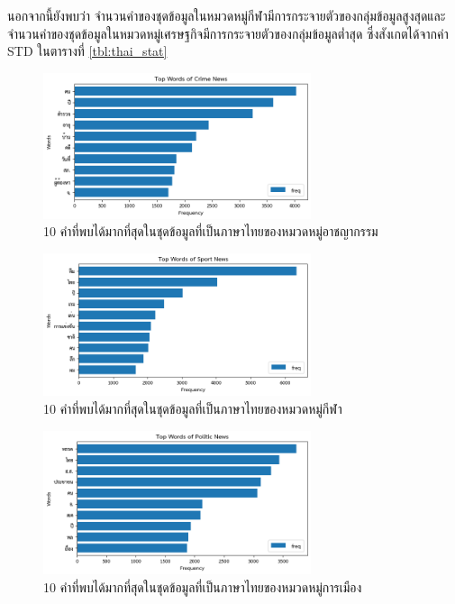\documentclass[12pt,oneside,openright,a4paper]{cpe-thai-project}
\begin{document}
        นอกจากนี้ยังพบว่า จำนวนคำของชุดข้อมูลในหมวดหมู่กีฬามีการกระจายตัวของกลุ่มข้อมูลสูงสุดและจำนวนคำของชุดข้อมูลในหมวดหมู่เศรษฐกิจมีการกระจายตัวของกลุ่มข้อมูลต่ำสุด
        ซึ่งสังเกตได้จากค่า STD ในตารางที่ \ref{tbl:thai_stat}
        \newpage
        \begin{figure}[!ht]\centering
          \includegraphics[width=0.7\textwidth]{./img/thai_stat/crime_bar.png}
          \caption{10 คำที่พบได้มากที่สุดในชุดข้อมูลที่เป็นภาษาไทยของหมวดหมู่อาชญากรรม}\label{fig:crime_bar_th}
        \end{figure}
        \begin{figure}[!ht]\centering
          \includegraphics[width=0.7\textwidth]{./img/thai_stat/sport_bar.png}
          \caption{10 คำที่พบได้มากที่สุดในชุดข้อมูลที่เป็นภาษาไทยของหมวดหมู่กีฬา}\label{fig:sport_bar_th}
        \end{figure}
        \begin{figure}[!ht]\centering
          \includegraphics[width=0.7\textwidth]{./img/thai_stat/polit_bar.png}
          \caption{10 คำที่พบได้มากที่สุดในชุดข้อมูลที่เป็นภาษาไทยของหมวดหมู่การเมือง}\label{fig:polit_bar_th}
        \end{figure}
\end{document}
